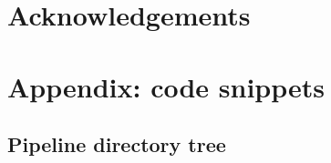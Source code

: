 \documentclass[reprint,aps,prd,superscriptaddress,showkeys,showpacs]{revtex4-1}
\begin{document}
 

\section*{Acknowledgements}


\section*{Appendix: code snippets}

\subsection{Pipeline directory tree}



\label{lastpage}
\end{document}
